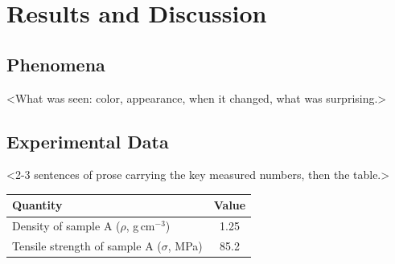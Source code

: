 \documentclass[12pt]{sustech-labreport}
\begin{document}
\section{Results and Discussion}
\subsection{Phenomena}
<What was seen: color, appearance, when it changed, what was surprising.>

\subsection{Experimental Data}
<2-3 sentences of prose carrying the key measured numbers, then the table.>

\begin{center}
  \label{tab:props}
  \begin{tabular}{lc}
    \toprule
    Quantity & Value \\
    \midrule
    Density of sample A ($\rho$, g\,cm$^{-3}$)  & 1.25 \\
    Tensile strength of sample A ($\sigma$, MPa) & 85.2 \\
    \bottomrule
  \end{tabular}
\end{center}
\end{document}
